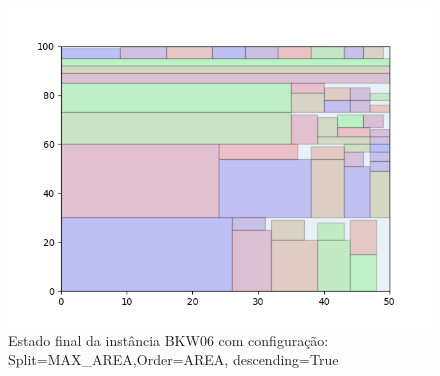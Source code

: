 \begin{figure}[H]
    \centering
    \caption[]{Estado final da instância BKW06 com configuração: Split=MAX_AREA,Order=AREA, descending=True}
    \label{fig:bkw06-max_area-area-true}
    \includegraphics[scale=0.5]{output/figures/bkw/bkw06/max_area/area/true/00}
\end{figure}